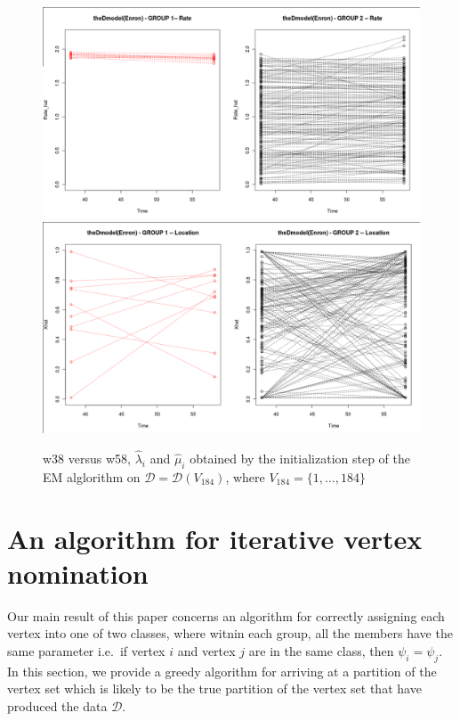 \documentclass[12pt]{article}%
\begin{document}
\begin{figure}
\begin{center}
{\includegraphics[scale=0.20]{v184_w38vsw58_Rate.png}}
{\includegraphics[scale=0.20]{v184_w38vsw58_Location.png}}
\end{center}
\caption{w38 versus w58, $\hat{\lambda}_i$ and $\hat{\mu}_i$ obtained by the initialization step of the EM alglorithm on $\mathcal D = \mathcal D(V_{184})$, where $V_{184} = \{1,\ldots, 184\}$}
\label{cepplot}
\end{figure}

\section{An algorithm for iterative vertex nomination}
Our main result of this paper concerns an algorithm for correctly assigning 
each vertex into one of two classes, where witnin each group, all the members  
have the same parameter i.e.\ if vertex $i$ and vertex $j$ are in the same
class, then $\psi_i = \psi_j$.  
In this section, we provide a greedy algorithm for arriving at a partition 
of the vertex set which is likely to be the true partition of 
the vertex set that  have produced the data $\mathcal D$.
\end{document}

